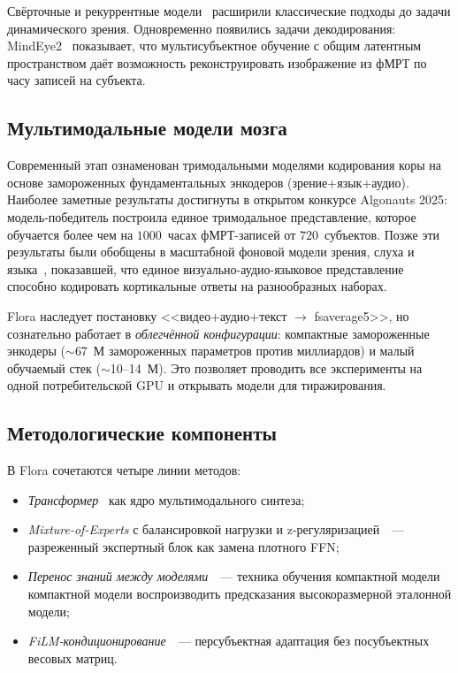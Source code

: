 \documentclass[11pt,a4paper]{article}
\begin{document}
Свёрточные и рекуррентные модели~\cite{Wen2018} расширили
классические подходы до задачи динамического зрения. Одновременно
появились задачи декодирования: MindEye2~\cite{Scotti2024}
показывает, что мультисубъектное обучение с общим латентным
пространством даёт возможность реконструировать изображение из
фМРТ по часу записей на субъекта.

\subsection{Мультимодальные модели мозга}
\label{sec:related-multimodal}

Современный этап ознаменован тримодальными моделями кодирования
коры на основе замороженных фундаментальных энкодеров
(зрение+язык+аудио). Наиболее заметные результаты
достигнуты в открытом конкурсе Algonauts 2025: модель-победитель
построила единое тримодальное представление, которое обучается
более чем на $1000$~часах фМРТ-записей от $720$~субъектов.
Позже эти результаты были обобщены в масштабной фоновой
модели зрения, слуха и языка~\cite{dAscoli2026tribev2},
показавшей, что единое визуально-аудио-языковое представление
способно кодировать кортикальные ответы на разнообразных наборах.

Flora наследует постановку <<видео+аудио+текст $\rightarrow$
fsaverage5>>, но сознательно работает в \emph{облегчённой
конфигурации}: компактные замороженные энкодеры
($\sim$67~М замороженных параметров против миллиардов) и малый
обучаемый стек ($\sim$10--14~М). Это позволяет проводить все
эксперименты на одной потребительской GPU и открывать модели
для тиражирования.

\subsection{Методологические компоненты}
\label{sec:related-methodology}

В Flora сочетаются четыре линии методов:
\begin{itemize}[leftmargin=*]
    \item \emph{Трансформер}~\cite{Vaswani2017} как ядро мультимодального
          синтеза;
    \item \emph{Mixture-of-Experts} с балансировкой нагрузки и
          z-регуляризацией~\cite{Fedus2022}~--- разреженный
          экспертный блок как замена плотного FFN;
    \item \emph{Перенос знаний между моделями}~\cite{Hinton2015}~--- техника обучения компактной модели
          компактной модели воспроизводить предсказания
          высокоразмерной эталонной модели;
    \item \emph{FiLM-кондиционирование}~\cite{Perez2018}~---
          персубъектная адаптация без посубъектных весовых
          матриц.
\end{itemize}
\end{document}

